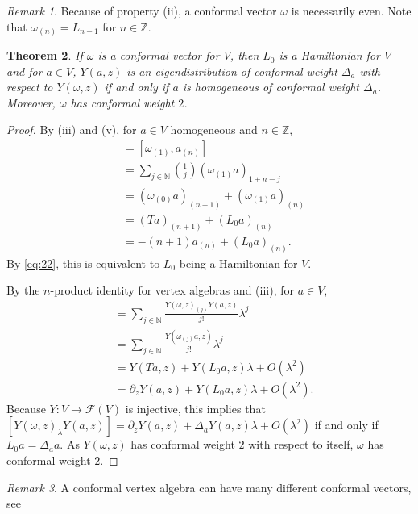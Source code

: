 \documentclass[a4paper, 12pt, reqno]{amsart}
\newtheorem{theorem}{Theorem}[section]
\theoremstyle{remark}
\newtheorem{remark}[theorem]{Remark}
\numberwithin{equation}{subsection}
\begin{document}
\begin{remark}
  \label{rmk:16}
  Because of property (ii), a conformal vector $\omega$ is necessarily even.
  Note that $\omega_{(n)} = L_{n - 1}$ for $n \in \mathbb{Z}$.
\end{remark}

\begin{theorem}
  \label{thr:23}
  If $\omega$ is a conformal vector for $V$, then $L_0$ is a Hamiltonian for $V$ and for $a \in V$, $Y(a, z)$ is an eigendistribution of conformal weight $\Delta_a$ with respect to $Y(\omega, z)$ if and only if $a$ is homogeneous of conformal weight $\Delta_a$.
  Moreover, $\omega$ has conformal weight $2$.
\end{theorem}

\begin{proof}
  By (iii) and (v), for $a \in V$ homogeneous and $n \in \mathbb{Z}$,
  \begin{align*}
    [L_0, a_{(n)}] &= [\omega_{(1)}, a_{(n)}] \\
    &= \sum_{j \in \mathbb{N}}\binom{1}{j}(\omega_{(1)}a)_{1 + n - j} \\
    &= (\omega_{(0)}a)_{( n + 1)} + (\omega_{(1)}a)_{(n)} \\
    &= (Ta)_{(n + 1)} + (L_0a)_{(n)} \\
    &= -(n + 1)a_{(n)} + (L_0a)_{(n)}.
  \end{align*}
  By \eqref{eq:22}, this is equivalent to $L_0$ being a Hamiltonian for $V$.

  By the $n$-product identity for vertex algebras and (iii), for $a \in V$,
  \begin{align*}
    [Y(\omega, z)_{\lambda}Y(a, z)] &= \sum_{j \in \mathbb{N}}\frac{Y(\omega, z)_{(j)}Y(a, z)}{j!}\lambda^j \\
    &= \sum_{j \in \mathbb{N}}\frac{Y(\omega_{(j)}a, z)}{j!}\lambda^j \\
    &= Y(Ta, z) + Y(L_0a, z)\lambda + O(\lambda^2) \\
    &= \partial_zY(a, z) + Y(L_0a, z)\lambda + O(\lambda^2).
  \end{align*}
  Because $Y: V \to \mathcal{F}(V)$ is injective, this implies that $[Y(\omega, z)_{\lambda}Y(a, z)] = \partial_zY(a, z) + \Delta_aY(a, z)\lambda + O(\lambda^2)$ if and only if $L_0a = \Delta_aa$.
  As $Y(\omega, z)$ has conformal weight $2$ with respect to itself, $\omega$ has conformal weight $2$.
\end{proof}

\begin{remark}
  \label{rmk:17}
  A conformal vertex algebra can have many different conformal vectors, see \cite[Example 2.5.9]{frenkel_vertex_2001}
\end{remark}
\end{document}
